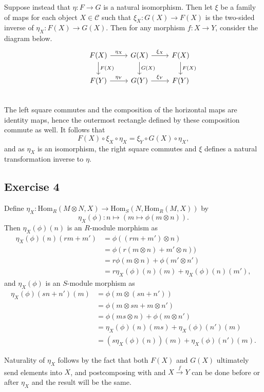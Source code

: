\documentclass{article}
\theoremstyle{definition}
\newcommand{\Hom}{\text{Hom}}
\begin{document}
Suppose instead that $\eta : F \to G$ is a natural isomorphism. Then let $\xi$
be a family of maps for each object $X \in \mathcal{C}$ such that $\xi_X : G(X)
\to F(X)$ is the two-sided inverse of $\eta_X : F(X) \to G(X)$. Then for any
morphism $f : X \to Y$, consider the diagram below.
\[
\begin{tikzcd}
	& F(X)
	\arrow{r}{\eta_X}
	\arrow{d}{F(X)}
	& G(X)
	\arrow{r}{\xi_X}
	\arrow{d}{G(X)}
	& F(X) 
	\arrow{d}{F(X)}
	\\
	& F(Y)
	\arrow{r}{\eta_Y}
	& G(Y)
	\arrow{r}{\xi_Y}
	& F(Y) \\
\end{tikzcd}
\] 
The left square commutes and the composition of the horizontal maps are
identity maps, hence the outermost rectangle defined by these composition
commute as well. It follows that
\[
	F(X) \circ \xi_X \circ \eta_X
	=
	\xi_Y \circ G(X) \circ \eta_X,
\]
and as $\eta_X$ is an isomorphism, the right square commutes and $\xi$ defines
a natural transformation inverse to $\eta$.


\subsection*{Exercise 4}

Define $\eta_X : \Hom_{R}(M \otimes N, X) \to \Hom_S(N, \Hom_{R}(M, X))$ by
\[
	\eta_X(\phi) : n \mapsto (m \mapsto \phi(m \otimes n)).
\] 
Then $\eta_X(\phi)(n)$ is an $R$-module morphism as 
\begin{align*}
	\eta_X(\phi)(n)(rm + m')
	&=
	\phi((rm + m') \otimes n) \\
	&=
	\phi(r(m \otimes n) + m' \otimes n)) \\
	&=
	r\phi(m \otimes n) + \phi(m' \otimes n') \\
	&=
	r\eta_X(\phi)(n)(m)
	+
	\eta_X(\phi)(n)(m'),
\end{align*}
and $\eta_X(\phi)$ is an $S$-module morphism as
\begin{align*}
	\eta_X(\phi)(sn + n')(m)
	&=
	\phi(m \otimes (sn + n')) \\
	&=
	\phi(m \otimes sn + m \otimes n') \\
	&=
	\phi(ms \otimes n) + \phi(m \otimes n') \\
	&=
	\eta_X(\phi)(n)(ms)
	+
	\eta_X(\phi)(n')(m) \\
	&=
	(s\eta_X(\phi)(n))(m)
	+
	\eta_X(\phi)(n')(m).
\end{align*}

Naturality of $\eta_X$ follows by the fact that both $F(X)$ and $G(X)$
ultimately send elements into $X$, and postcomposing with and $X \xrightarrow{f}
Y$ can be done before or after $\eta_X$ and the result will be the same. \\
\end{document}
